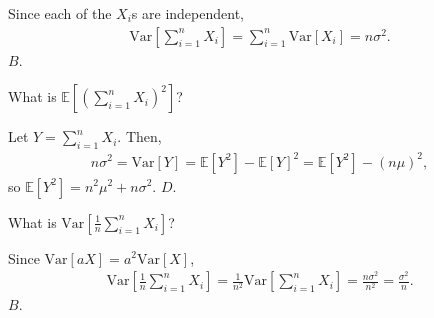 \documentclass[a4paper]{article}
\begin{document}
\begin{Solution}
	Since each of the $X_i$s are independent,
	\begin{align*}
		\text{Var}\left[ \sum_{i = 1}^{n} X_i \right] = \sum_{i = 1}^{n} \text{Var}[X_i] = n \sigma^2.
	\end{align*}
	$\boxed{B}$.
\end{Solution}
\begin{Exercise}
	What is $\mathbb{E}[(\sum_{i = 1}^{n} X_i)^2]$?
\end{Exercise}
\begin{Solution}
	Let $Y = \sum_{i = 1}^{n} X_i$. Then,
	\begin{align*}
		n\sigma^2 = \text{Var}[Y] = \mathbb{E}[Y^2] - \mathbb{E}[Y]^2 = \mathbb{E}[Y^2] - (n \mu)^2,
	\end{align*}
	so $\mathbb{E}[Y^2] = n^2 \mu^2 + n \sigma^2.$ $\boxed{D}$.
\end{Solution}
\begin{Exercise}
	What is $\text{Var}\left[\frac{1}{n} \sum_{i = 1}^{n} X_i \right]$?
\end{Exercise}
\begin{Solution}
	Since $\text{Var}[aX] = a^2 \text{Var}[X]$,
	\begin{align*}
		\text{Var} \left[ \frac{1}{n} \sum_{i = 1}^{n} X_i \right] = \frac{1}{n^2}\text{Var} \left[ \sum_{i = 1}^{n} X_i \right] = \frac{n \sigma^2}{n^2} = \frac{\sigma^2}{n}.
	\end{align*}
	$\boxed{B}$.
\end{Solution}
\end{document}

